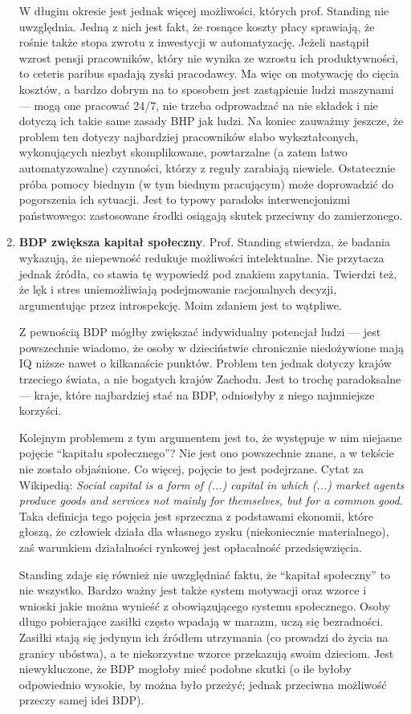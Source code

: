 \documentclass[11pt]{article}
\begin{document}
\begin{enumerate}
		\par W długim okresie jest jednak więcej możliwości, których prof. Standing nie uwzględnia. Jedną z nich jest fakt, że rosnące koszty płacy sprawiają, że rośnie także stopa zwrotu z inwestycji w automatyzację. Jeżeli nastąpił wzrost pensji pracowników, który nie wynika ze wzrostu ich produktywności, to ceteris paribus spadają zyski pracodawcy. Ma więc on motywację do cięcia kosztów, a bardzo dobrym na to sposobem jest zastąpienie ludzi maszynami — mogą one pracować 24/7, nie trzeba odprowadzać na nie składek i nie dotyczą ich takie same zasady BHP jak ludzi. Na koniec zauważmy jeszcze, że problem ten dotyczy najbardziej pracowników słabo wykształconych, wykonujących niezbyt skomplikowane, powtarzalne (a zatem łatwo automatyzowalne) czynności, którzy z reguły zarabiają niewiele. Ostatecznie próba pomocy biednym (w tym biednym pracującym) może doprowadzić do pogorszenia ich sytuacji. Jest to typowy paradoks interwencjonizmi państwowego: zastosowane środki osiągają skutek przeciwny do zamierzonego.
		\item \textbf{BDP zwiększa kapitał społeczny}. Prof. Standing stwierdza, że badania wykazują, że niepewność redukuje możliwości intelektualne. Nie przytacza jednak źródła, co stawia tę wypowiedź pod znakiem zapytania. Twierdzi też, że lęk i stres uniemożliwiają podejmowanie racjonalnych decyzji, argumentując przez introspekcję. Moim zdaniem jest to wątpliwe.
		\par Z pewnością BDP mógłby zwiększać indywidualny potencjał ludzi — jest powszechnie wiadomo, że osoby w dzieciństwie chronicznie niedożywione mają IQ niższe nawet o kilkanaście punktów. Problem ten jednak dotyczy krajów trzeciego świata, a nie bogatych krajów Zachodu. Jest to trochę paradoksalne — kraje, które najbardziej stać na BDP, odniosłyby z niego najmniejsze korzyści.
		\par Kolejnym problemem z tym argumentem jest to, że występuje w nim niejasne pojęcie ``kapitału społecznego''? Nie jest ono powszechnie znane, a w tekście nie zostało objaśnione. Co więcej, pojęcie to jest podejrzane. Cytat za Wikipedią: \textit{Social capital is a form of (...) capital in which (...) market agents produce goods and services not mainly for themselves, but for a common good}. Taka definicja tego pojęcia jest sprzeczna z podstawami ekonomii, które głoszą, że człowiek działa dla własnego zysku (niekoniecznie materialnego), zaś warunkiem działalności rynkowej jest opłacalność przedsięwzięcia.
		\par Standing zdaje się również nie uwzględniać faktu, że ``kapitał społeczny'' to nie wszystko. Bardzo ważny jest także system motywacji oraz wzorce i wnioski jakie można wynieść z obowiązującego systemu społecznego. Osoby długo pobierające zasiłki często wpadają w marazm, uczą się bezradności. Zasiłki stają się jedynym ich źródłem utrzymania (co prowadzi do życia na granicy ubóstwa), a te niekorzystne wzorce przekazują swoim dzieciom. Jest niewykluczone, że BDP mogłoby mieć podobne skutki (o ile byłoby odpowiednio wysokie, by można było przeżyć; jednak przeciwna możliwość przeczy samej idei BDP).

\end{enumerate}
\end{document}
